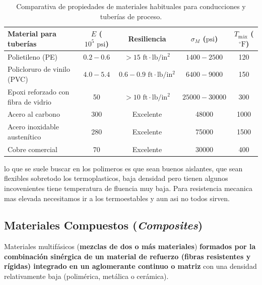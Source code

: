 \begin{table}[H]
    \centering
    \begin{tabular}{lcccc}
        \toprule
        \textbf{Material para tuberías}     & \textbf{$E$ ($10^5\text{ psi}$)} & \textbf{Resiliencia}                            & \textbf{$\sigma_M$ ($\text{psi}$)} & \textbf{$T_{\text{máx}}$ ($^\circ\text{F}$)} \\
        \midrule
        Polietileno (PE)                    & $0.2 - 0.6$                      & $>15\text{ ft}\cdot\text{lb}/\text{in}^2$       & $1400 - 2500$                      & 120                                          \\
        Policloruro de vinilo (PVC)         & $4.0 - 5.4$                      & $0.6 - 0.9\text{ ft}\cdot\text{lb}/\text{in}^2$ & $6400 - 9000$                      & 150                                          \\
        Epoxi reforzado con fibra de vidrio & 50                               & $>10\text{ ft}\cdot\text{lb}/\text{in}^2$       & $25000 - 30000$                    & 300                                          \\
        Acero al carbono                    & 300                              & Excelente                                       & 48000                              & 1000                                         \\
        Acero inoxidable austenítico        & 280                              & Excelente                                       & 75000                              & 1500                                         \\
        Cobre comercial                     & 70                               & Excelente                                       & 30000                              & 400                                          \\
        \bottomrule
    \end{tabular}
    \caption{Comparativa de propiedades de materiales habituales para conducciones y tuberías de proceso.}
    \label{tab:comparativa_tuberias}
\end{table}
lo que se suele buscar en los polimeros es que sean buenos aislantes, que sean flexibles sobretodo los termoplasticos, baja densidad pero tienen algunos incovenientes tiene temperatura de fluencia muy baja. Para resistencia mecanica mas elevada necesitamos ir a los termoestables y aun asi no todos sirven.
\subsection{Materiales Compuestos (\textit{Composites})}
Materiales multifásicos (\textbf{mezclas de dos o más materiales}) \textbf{formados por la combinación sinérgica de un material de refuerzo (fibras resistentes y rígidas) integrado en un aglomerante continuo o matriz} con una densidad relativamente baja (polimérica, metálica o cerámica).

